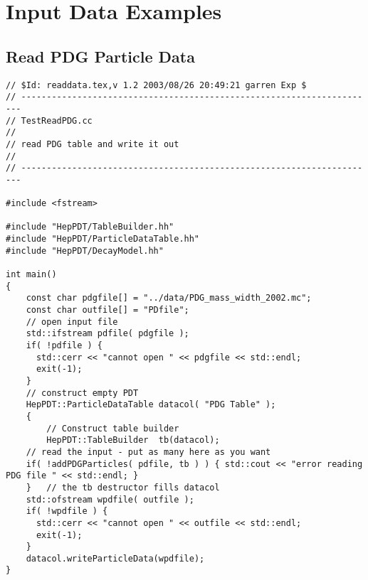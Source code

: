 \section { Input Data Examples}
\label{readdata}

\subsection { Read PDG Particle Data }
\begin{verbatim}
// $Id: readdata.tex,v 1.2 2003/08/26 20:49:21 garren Exp $
// ----------------------------------------------------------------------
// TestReadPDG.cc
//
// read PDG table and write it out
//
// ----------------------------------------------------------------------

#include <fstream>

#include "HepPDT/TableBuilder.hh"
#include "HepPDT/ParticleDataTable.hh"
#include "HepPDT/DecayModel.hh"

int main()
{
    const char pdgfile[] = "../data/PDG_mass_width_2002.mc";
    const char outfile[] = "PDfile";
    // open input file
    std::ifstream pdfile( pdgfile );
    if( !pdfile ) { 
      std::cerr << "cannot open " << pdgfile << std::endl;
      exit(-1);
    }
    // construct empty PDT
    HepPDT::ParticleDataTable datacol( "PDG Table" );
    {
        // Construct table builder
        HepPDT::TableBuilder  tb(datacol);
	// read the input - put as many here as you want
	if( !addPDGParticles( pdfile, tb ) ) { std::cout << "error reading PDG file " << std::endl; }
    }	// the tb destructor fills datacol
    std::ofstream wpdfile( outfile );
    if( !wpdfile ) { 
      std::cerr << "cannot open " << outfile << std::endl;
      exit(-1);
    }
    datacol.writeParticleData(wpdfile);
}
\end{verbatim}

